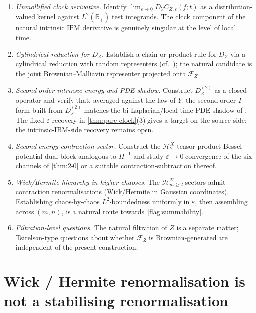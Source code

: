 \documentclass[EJP]{ejpecp}
\newcommand{\R}{\mathbb{R}}
\newcommand{\Hilb}{\mathcal{H}}
\newcommand{\IBM}{Z}
\begin{document}
\begin{enumerate}
\item \emph{Unmollified clock derivative.} Identify
$\lim_{\varepsilon\to 0}D_Y C_{\IBM,\varepsilon}(f;t)$ as a
distribution-valued kernel against $L^{2}(\R_{+})$ test integrands.
The clock component of the natural intrinsic IBM derivative is
genuinely singular at the level of local time.

\item \emph{Cylindrical reduction for $D_\IBM$.} Establish a chain
or product rule for $D_\IBM$ via a cylindrical reduction with random
representers (cf.\ \cite{Fontes-OperatorDerivative}); the natural
candidate is the joint Brownian--Malliavin representer projected
onto $\mathcal F_\IBM$.

\item \emph{Second-order intrinsic energy and PDE shadow.} Construct
$D_\IBM^{(2)}$ as a closed operator and verify that, averaged against
the law of $Y$, the second-order $\Gamma$-form built from
$D_\IBM^{(2)}$ matches the bi-Laplacian/local-time PDE shadow of
\cite{AllouZheng}. The fixed-$\varepsilon$ recovery in
\cref{thm:pure-clock}(3) gives a target on the source side; the
intrinsic-IBM-side recovery remains open.

\item \emph{Second-energy-contraction sector.} Construct the
$\Hilb_2^X$ tensor-product Bessel-potential dual block analogous
to $H^{-1}$ and study $\varepsilon\to 0$ convergence of the six
channels of \cref{thm:2-0} or a suitable contraction-subtraction
thereof.

\item \emph{Wick/Hermite hierarchy in higher chaoses.} The
$\Hilb_{m\ge 2}^X$ sectors admit contraction renormalisations
(Wick/Hermite in Gaussian coordinates). Establishing chaos-by-chaos
$L^{2}$-boundedness uniformly in $\varepsilon$, then assembling
across $(m,n)$, is a natural route towards~\cref{flag:summability}.

\item \emph{Filtration-level questions.} The natural filtration of
$\IBM$ is a separate matter; Tsirelson-type questions about whether
$\mathcal F_\IBM$ is Brownian-generated are independent of the
present construction.
\end{enumerate}

\appendix

\section{Wick / Hermite renormalisation is not a stabilising renormalisation}\label{sec:wick-app}
\end{document}
